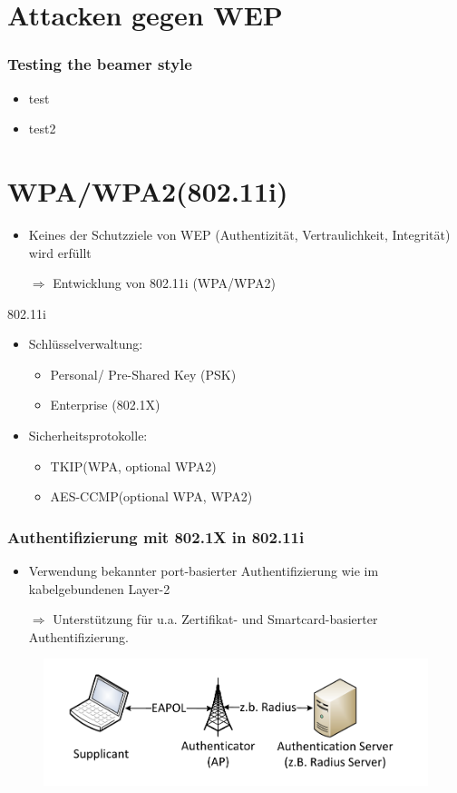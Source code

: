 \documentclass{beamer}
\begin{document}
\section{Attacken gegen WEP}
\begin{frame}
\frametitle{Testing the beamer style}
\begin{itemize}
	\item test
	\item test2
\end{itemize}

\end{frame}


\section{WPA/WPA2(802.11i)}
\begin{frame}
\begin{itemize}
	\item Keines der Schutzziele von WEP (Authentizität, Vertraulichkeit, Integrität) wird erfüllt
	\item[$\Rightarrow$] Entwicklung von 802.11i (WPA/WPA2)
\end{itemize}
\begin{block}{802.11i}
\begin{itemize}
	\item Schlüsselverwaltung:
	\begin{itemize}
		\item Personal/ Pre-Shared Key (PSK)
		\item Enterprise (802.1X)
	\end{itemize}
	\item Sicherheitsprotokolle:
	\begin{itemize}
		\item TKIP(WPA, optional WPA2)
		\item AES-CCMP(optional WPA, WPA2)
	\end{itemize}
\end{itemize}
\end{block}
\end{frame}

\begin{frame}
	\frametitle{Authentifizierung mit 802.1X in 802.11i}
	\begin{itemize}
		\item Verwendung bekannter port-basierter Authentifizierung wie im kabelgebundenen Layer-2
		\item[$\Rightarrow$] Unterstützung für u.a. Zertifikat- und Smartcard-basierter Authentifizierung.
	\end{itemize}
\begin{figure}
\includegraphics[scale=0.7]{figures/ap_radius}
\end{figure}
\end{frame}
\end{document}
